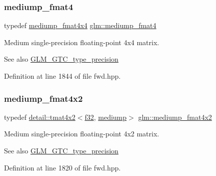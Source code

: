 \subsubsection{\texorpdfstring{mediump\+\_\+fmat4}{mediump\_fmat4}}
{\footnotesize\ttfamily typedef \hyperlink{group__gtc__type__precision_ga7f4ae9d05ca94005a0b7d8e3c59943cd}{mediump\+\_\+fmat4x4} \hyperlink{group__gtc__type__precision_ga6cd3ae1f3509b79061edcc83564769d4}{glm\+::mediump\+\_\+fmat4}}

Medium single-\/precision floating-\/point 4x4 matrix. \begin{DoxySeeAlso}{See also}
\hyperlink{group__gtc__type__precision}{G\+L\+M\+\_\+\+G\+T\+C\+\_\+type\+\_\+precision} 
\end{DoxySeeAlso}


Definition at line 1844 of file fwd.\+hpp.

\mbox{\label{group__gtc__type__precision_ga09a2851d38fe3cf52735a1d26199bdcc}} 
\subsubsection{\texorpdfstring{mediump\+\_\+fmat4x2}{mediump\_fmat4x2}}
{\footnotesize\ttfamily typedef \hyperlink{structglm_1_1detail_1_1tmat4x2}{detail\+::tmat4x2}$<$\hyperlink{group__gtc__type__precision_ga0ec999b57f5330d9021256e96038df04}{f32}, \hyperlink{namespaceglm_a0f04f086094c747d227af4425893f545a6416f3ea0c9025fb21ed50c4d6620482}{mediump}$>$ \hyperlink{group__gtc__type__precision_ga09a2851d38fe3cf52735a1d26199bdcc}{glm\+::mediump\+\_\+fmat4x2}}

Medium single-\/precision floating-\/point 4x2 matrix. \begin{DoxySeeAlso}{See also}
\hyperlink{group__gtc__type__precision}{G\+L\+M\+\_\+\+G\+T\+C\+\_\+type\+\_\+precision} 
\end{DoxySeeAlso}


Definition at line 1820 of file fwd.\+hpp.

\mbox{\label{group__gtc__type__precision_ga5e5de428d1e1da2c593a6245d92dd8c0}} 
